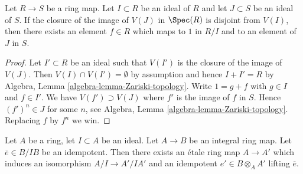\begin{lemma}
\label{lemma-separate-image-closed-from-closed}
Let $R \to S$ be a ring map. Let $I \subset R$ be an ideal of $R$
and let $J \subset S$ be an ideal of $S$. If the closure of the image
of $V(J)$ in $\Spec(R)$ is disjoint from $V(I)$, then there exists
an element $f \in R$ which maps to $1$ in $R/I$ and to an element
of $J$ in $S$.
\end{lemma}

\begin{proof}
Let $I' \subset R$ be an ideal such that $V(I')$ is the closure of
the image of $V(J)$. Then $V(I) \cap V(I') = \emptyset$ by assumption
and hence $I + I' = R$ by
Algebra, Lemma \ref{algebra-lemma-Zariski-topology}.
Write $1 = g + f$ with $g \in I$ and $f \in I'$.
We have $V(f') \supset V(J)$ where $f'$ is the image of $f$ in $S$.
Hence $(f')^n \in J$ for some $n$, see
Algebra, Lemma \ref{algebra-lemma-Zariski-topology}.
Replacing $f$ by $f^n$ we win.
\end{proof}

\begin{lemma}
\label{lemma-lift-idempotent-upstairs}
Let $A$ be a ring, let $I \subset A$ be an ideal.
Let $A \to B$ be an integral ring map.
Let $\overline{e} \in B/IB$ be an idempotent.
Then there exists an \'etale ring map $A \to A'$
which induces an isomorphism $A/I \to A'/IA'$ and an idempotent
$e' \in B \otimes_A A'$ lifting $\overline{e}$.
\end{lemma}

